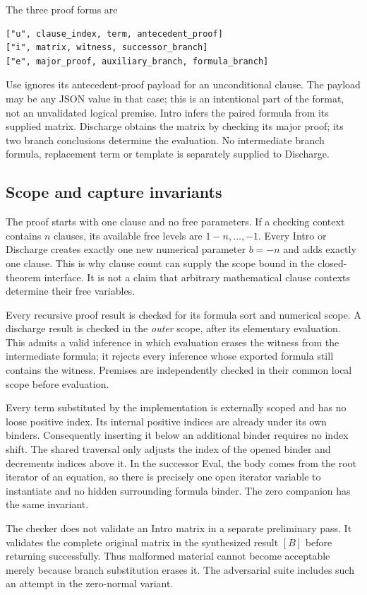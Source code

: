 The three proof forms are
\begin{lstlisting}[language={}]
["u", clause_index, term, antecedent_proof]
["i", matrix, witness, successor_branch]
["e", major_proof, auxiliary_branch, formula_branch]
\end{lstlisting}
Use ignores its antecedent-proof payload for an unconditional clause. The
payload may be any JSON value in that case; this is an intentional part of
the format, not an unvalidated logical premise. Intro infers the paired
formula from its supplied matrix. Discharge obtains the matrix by checking
its major proof; its two branch conclusions determine the evaluation.
No intermediate branch formula, replacement term or template is separately
supplied to Discharge.

\subsection{Scope and capture invariants}

The proof starts with one clause and no free parameters. If a checking
context contains $n$ clauses, its available free levels are
$1-n,\ldots,-1$. Every Intro or Discharge creates exactly one new numerical
parameter $b=-n$ and adds exactly one clause. This is why clause count can
supply the scope bound in the closed-theorem interface. It is not a claim
that arbitrary mathematical clause contexts determine their free variables.

Every recursive proof result is checked for its formula sort and numerical
scope. A discharge result is checked in the \emph{outer} scope, after its
elementary evaluation. This admits a valid inference in which evaluation
erases the witness from the intermediate formula; it rejects every
inference whose exported formula still contains the witness. Premises
are independently checked in their common local scope before evaluation.

Every term substituted by the implementation is externally scoped and has
no loose positive index. Its internal positive indices are already under
its own binders. Consequently inserting it below an additional binder
requires no index shift. The shared traversal only adjusts the index of
the opened binder and decrements indices above it. In the successor Eval,
the body comes from the root iterator of an equation, so there is precisely
one open iterator variable to instantiate and no hidden surrounding formula
binder. The zero companion has the same invariant.

The checker does not validate an Intro matrix in a separate preliminary
pass. It validates the complete original matrix in the synthesized result
$[B]$ before returning successfully. Thus malformed material cannot become
acceptable merely because branch substitution erases it. The adversarial
suite includes such an attempt in the zero-normal variant.

